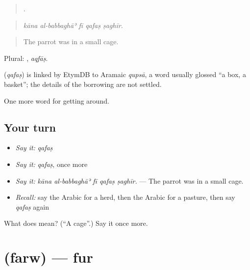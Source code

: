\begin{quote}
    .
\end{quote}

\begin{quote}
\emph{kāna al-babbaghāʾ fī qafaṣ ṣaghīr.}
\end{quote}

\begin{quote}
The parrot was in a small cage.
\end{quote}

Plural: , \emph{aqfāṣ}.

\begin{cousinweb}
\textbf{} (\emph{qafaṣ}) is linked by EtymDB to Aramaic \emph{qupsā}, a word usually glossed \textquotedblleft{}a box, a basket\textquotedblright{}; the details of the borrowing are not settled.
\end{cousinweb}

\begin{grammarlens}[title={What you've built}]
One more word for getting around.
\end{grammarlens}

\subsection*{Your turn}
\begin{itemize}
\raggedright
  \item \emph{Say it:} \emph{qafaṣ}
  \item \emph{Say it:} \emph{qafaṣ}, once more
  \item \emph{Say it:} \emph{kāna al-babbaghāʾ fī qafaṣ ṣaghīr.} — The parrot was in a small cage.
  \item \emph{Recall:} say the Arabic for a herd, then the Arabic for a pasture, then say \emph{qafaṣ} again
\end{itemize}

\begin{tcolorbox}[breakable,colback=teal!4,colframe=teal!35!black,title={Before you move on}]
What does  mean? (\textquotedblleft{}A cage\textquotedblright{}.) Say it once more.
\end{tcolorbox}
\section[\texorpdfstring{\ar{فرو} (farw)}{فرو (farw)}]{ (farw) — fur}

\label{lesson:AR-C478-farw}



